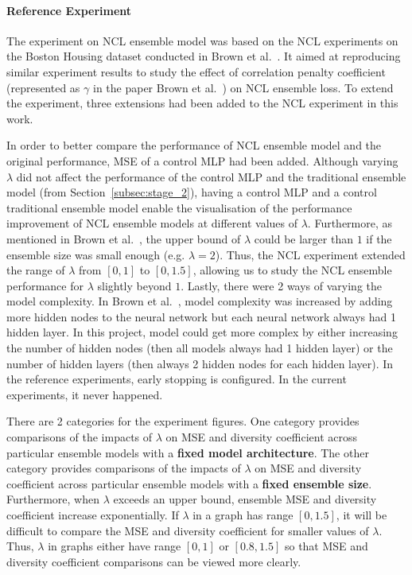 \paragraph{Reference Experiment}
The experiment on NCL ensemble model was based on the NCL experiments on the Boston Housing dataset conducted in Brown et al.\ \cite{brown2005managing}. It aimed at reproducing similar experiment results to study the effect of correlation penalty coefficient (represented as $\gamma$ in the paper Brown et al.\ \cite{brown2005managing}) on NCL ensemble loss. To extend the experiment, three extensions had been added to the NCL experiment in this work. 

In order to better compare the performance of NCL ensemble model and the original performance, MSE of a control MLP had been added. Although varying $\lambda$ did not affect the performance of the control MLP and the traditional ensemble model (from Section~\ref{subsec:stage_2}), having a control MLP and a control traditional ensemble model enable the visualisation of the performance improvement of NCL ensemble models at different values of $\lambda$. Furthermore, as mentioned in Brown et al.\ \cite{brown2005managing}, the upper bound of $\lambda$ could be larger than $1$ if the ensemble size was small enough (e.g. $\lambda = 2$). Thus, the NCL experiment extended the range of $\lambda$ from $[0, 1]$ to $[0, 1.5]$, allowing us to study the NCL ensemble performance for $\lambda$ slightly beyond $1$. Lastly, there were 2 ways of varying the model complexity. In Brown et al.\ \cite{brown2005managing}, model complexity was increased by adding more hidden nodes to the neural network but each neural network always had 1 hidden layer. In this project, model could get more complex by either increasing the number of hidden nodes (then all models always had 1 hidden layer) or the number of hidden layers (then always 2 hidden nodes for each hidden layer). In the reference experiments, early stopping is configured. In the current experiments, it never happened. 

There are 2 categories for the experiment figures. One category provides comparisons of the impacts of $\lambda$ on MSE and diversity coefficient across particular ensemble models with a \textbf{fixed model architecture}. The other category provides comparisons of the impacts of $\lambda$ on MSE and diversity coefficient across particular ensemble models with a \textbf{fixed ensemble size}. Furthermore, when $\lambda$ exceeds an upper bound, ensemble MSE and diversity coefficient increase exponentially. If $\lambda$ in a graph has range $[0, 1.5]$, it will be difficult to compare the MSE and diversity coefficient for smaller values of $\lambda$. Thus, $\lambda$ in graphs either have range $[0, 1]$ or $[0.8, 1.5]$ so that MSE and diversity coefficient comparisons can be viewed more clearly. 


